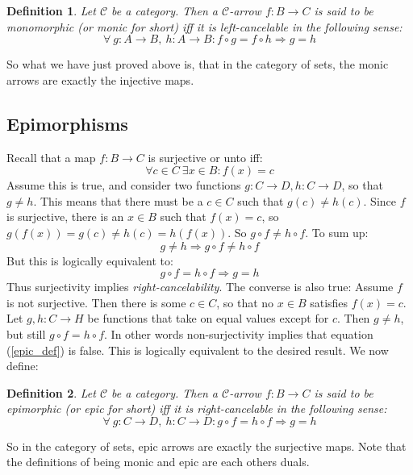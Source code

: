 \documentclass[12pt, a4paper]{article}
\newtheorem{definition}{Definition}[section]
\numberwithin{equation}{section}
\begin{document}
\begin{definition}
Let $\mathcal{C}$ be a category. Then a $\mathcal{C}$-arrow $f: B\rightarrow C$ is said to be monomorphic (or monic for short) iff it is left-cancelable in the following sense:
\begin{equation}
\forall\ g:A\rightarrow B,\ h:A\rightarrow B: f\circ g=f\circ h\Rightarrow g=h  
\end{equation}
\end{definition}

So what we have just proved above is, that in the category of sets, the monic arrows are exactly the injective maps.

\subsection{Epimorphisms}
Recall that a map $f:B\rightarrow C$ is surjective or unto iff:
\begin{equation}
\forall c\in C\ \exists x\in B: f(x)=c
\end{equation}
Assume this is true, and consider two functions $g:C\rightarrow D, h:C\rightarrow D$, so that $g\neq h$. This means that there must be a $c\in C$ such that $g(c)\neq h(c)$. Since $f$ is surjective, there is an $x\in B$ such that $f(x)=c$, so $g(f(x))=g(c)\neq h(c)=h(f(x))$. So $g\circ f\neq h\circ f$. To sum up:
\begin{equation}
g\neq h\Rightarrow g\circ f\neq h\circ f
\end{equation}
But this is logically equivalent to:
\begin{equation}
\label{epic_def}
g\circ f=h\circ f\Rightarrow g=h
\end{equation}
Thus surjectivity implies \textit{right-cancelability}. The converse is also true: Assume $f$ is not surjective. Then there is some $c\in C$, so that no $x\in B$ satisfies $f(x)=c$. Let $g, h:C\rightarrow H$ be functions that take on equal values except for $c$. Then $g\neq h$, but still $g\circ f=h\circ f$. In other words non-surjectivity implies that equation (\ref{epic_def}) is false. This is logically equivalent to the desired result. We now define:
\begin{definition}
Let $\mathcal{C}$ be a category. Then a $\mathcal{C}$-arrow $f: B\rightarrow C$ is said to be epimorphic (or epic for short) iff it is right-cancelable in the following sense:
\begin{equation}
\forall\ g:C\rightarrow D,\ h:C\rightarrow D: g\circ f=h\circ f\Rightarrow g=h  
\end{equation}
\end{definition}
So in the category of sets, epic arrows are exactly the surjective maps. Note that the definitions of being monic and epic are each others duals.
\end{document}
